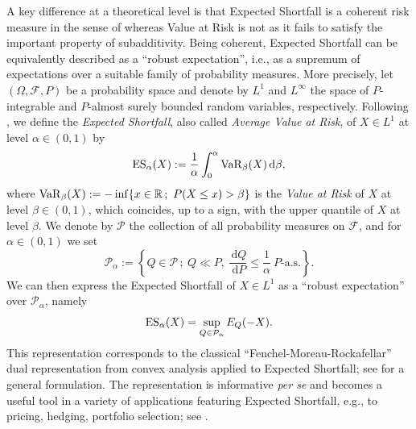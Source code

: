 \documentclass[12pt]{article}
\theoremstyle{plain}
\theoremstyle{definition}
\theoremstyle{remark}
\numberwithin{equation}{section}
\newcommand{\E}{E}
\newcommand{\probp}{P}
\newcommand{\probq}{Q}
\newcommand{\R}{\mathbb{R}}
\newcommand{\cF}{{\mathcal{F}}}
\newcommand{\cP}{\mathcal{P}}
\newcommand{\VaR}{\mathop {\rm VaR}\nolimits}
\newcommand{\ES}{\mathop {\rm ES}\nolimits}
\newcommand{\dd}{\,\mathrm{d}}
\begin{document}
A key difference at a theoretical level is that Expected Shortfall is a coherent risk measure in the sense of \cite{ArtznerDelbaenEberHeath1999} whereas Value at Risk is not as it fails to satisfy the important property of subadditivity. Being coherent, Expected Shortfall can be equivalently described as a ``robust expectation'', i.e., as a supremum of expectations over a suitable family of probability measures. More precisely, let $(\Omega,\cF,\probp)$ be a probability space 
and denote by $L^1$ and $L^\infty$ the space of $\probp$-integrable and $\probp$-almost surely bounded random variables, respectively. %
Following \cite{FoellmerSchied2002}, we define the \emph{Expected Shortfall}, also called {\em Average Value at Risk}, of $X\in L^1$ at level $\alpha\in(0,1)$ by
\[
\ES_\alpha(X) := \frac{1}{\alpha}\int_0^\alpha \VaR_\beta(X) \dd \beta,
\]
where $\VaR_\beta(X) := -\inf\{x\in\R \,; \ \probp(X\le x)>\beta\}$ is the \emph{Value at Risk} of $X$ at level $\beta \in (0, 1)$, which coincides, up to a sign, with the upper quantile of $X$ at level $\beta$. We denote by $\cP$ the collection of all probability measures on $\cF$, and for $\alpha \in (0, 1)$ we set
\begin{equation}
\label{eq:cP alpha}
\cP_\alpha := \left\{\probq\in\cP \,; \ \probq\ll\probp, \ \frac{\dd\probq}{\dd\probp}\le\frac{1}{\alpha} \ \mbox{$\probp$-a.s.}\right\}.
\end{equation}
We can then express the Expected Shortfall of $X\in L^1$ as a ``robust expectation'' over $\cP_\alpha$, namely
\begin{equation}
\label{eq: ES intro}
\ES_\alpha(X) = \sup_{\probq\in\cP_\alpha}\E_\probq(-X).
\end{equation}
This representation corresponds to the classical ``Fenchel-Moreau-Rockafellar'' dual representation from convex analysis applied to Expected Shortfall; see \cite[Theorem 2.3.3]{Zalinescu} for a general formulation. The representation is informative {\em per se} and becomes a useful tool in a variety of applications featuring Expected Shortfall, e.g., to pricing, hedging, portfolio selection; see \cite{ArducaMunari2023,Cherny2008,HerdegenKhan2022,MadanCherny2010,PflugRuszczynski2005,Rockafellar1974,RockafellarUryasev2000,RockafellarUryasev2002,RuszczynskiShapiro2006}.
\end{document}
